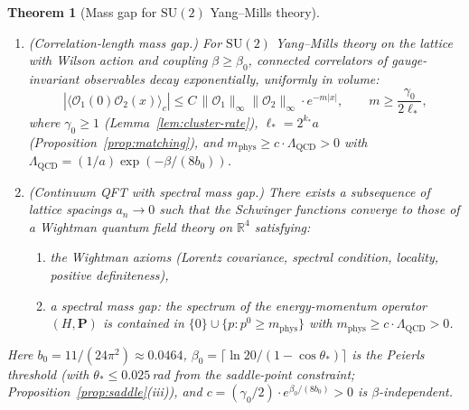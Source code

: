 \documentclass[11pt]{article}
\newtheorem{theorem}{Theorem}[section]
\theoremstyle{definition}
\newcommand{\SU}{\mathrm{SU}}
\newcommand{\R}{\mathbb{R}}
\newcommand{\Lam}{\Lambda_{\mathrm{QCD}}}
\begin{document}
\begin{theorem}[Mass gap for $\SU(2)$ Yang--Mills theory]%
\label{thm:unconditional}
\mbox{}
\begin{enumerate}[label=(\Alph*)]
\item \emph{(Correlation-length mass gap.)}
For $\SU(2)$ Yang--Mills theory on the lattice with Wilson action
and coupling $\beta\ge\beta_0$, connected correlators of gauge-invariant
observables decay exponentially, uniformly in volume:
\begin{equation}
|\langle\mathcal{O}_1(0)\mathcal{O}_2(x)\rangle_c|
\le C\,\|\mathcal{O}_1\|_\infty\|\mathcal{O}_2\|_\infty
\cdot e^{-m|x|},
\qquad
m\ge\frac{\gamma_0}{2\ell_*},
\end{equation}
where $\gamma_0\ge 1$ (Lemma~\ref{lem:cluster-rate}),
$\ell_*=2^{k_*}a$ (Proposition~\ref{prop:matching}), and
$m_{\mathrm{phys}}\ge c\cdot\Lam>0$ with
$\Lam=(1/a)\exp(-\beta/(8b_0))$.

\item \emph{(Continuum QFT with spectral mass gap.)}
There exists a subsequence of lattice spacings $a_n\to 0$ such that
the Schwinger functions converge to those of a Wightman quantum field
theory on $\R^4$ satisfying:
\begin{enumerate}[nosep,label=(\roman*)]
\item the Wightman axioms (Lorentz covariance, spectral condition,
locality, positive definiteness),
\item a spectral mass gap: the spectrum of the energy-momentum
operator $(H,\mathbf{P})$ is contained in
$\{0\}\cup\{p:p^0\ge m_{\mathrm{phys}}\}$ with
$m_{\mathrm{phys}}\ge c\cdot\Lam>0$.
\end{enumerate}
\end{enumerate}
Here $b_0=11/(24\pi^2)\approx 0.0464$,
$\beta_0=\lceil\ln 20/(1-\cos\theta_*)\rceil$ is the Peierls threshold
(with $\theta_*\le 0.025$\,rad from the saddle-point constraint;
Proposition~\ref{prop:saddle}(iii)), and
$c=(\gamma_0/2)\cdot e^{\beta_0/(8b_0)}>0$ is $\beta$-independent.
\end{theorem}
\end{document}
